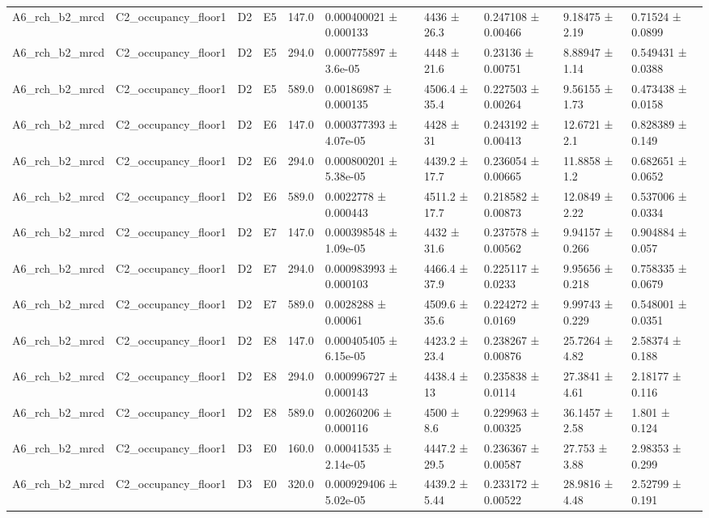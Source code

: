 \begin{table}
\begin{tabular}{llllllllll}
A6\_rch\_b2\_mrcd & C2\_occupancy\_floor1 & D2 & E5 & 147.0 & 0.000400021 ± 0.000133 & 4436 ± 26.3 & 0.247108 ± 0.00466 & 9.18475 ± 2.19 & 0.71524 ± 0.0899 \\
A6\_rch\_b2\_mrcd & C2\_occupancy\_floor1 & D2 & E5 & 294.0 & 0.000775897 ± 3.6e-05 & 4448 ± 21.6 & 0.23136 ± 0.00751 & 8.88947 ± 1.14 & 0.549431 ± 0.0388 \\
A6\_rch\_b2\_mrcd & C2\_occupancy\_floor1 & D2 & E5 & 589.0 & 0.00186987 ± 0.000135 & 4506.4 ± 35.4 & 0.227503 ± 0.00264 & 9.56155 ± 1.73 & 0.473438 ± 0.0158 \\
A6\_rch\_b2\_mrcd & C2\_occupancy\_floor1 & D2 & E6 & 147.0 & 0.000377393 ± 4.07e-05 & 4428 ± 31 & 0.243192 ± 0.00413 & 12.6721 ± 2.1 & 0.828389 ± 0.149 \\
A6\_rch\_b2\_mrcd & C2\_occupancy\_floor1 & D2 & E6 & 294.0 & 0.000800201 ± 5.38e-05 & 4439.2 ± 17.7 & 0.236054 ± 0.00665 & 11.8858 ± 1.2 & 0.682651 ± 0.0652 \\
A6\_rch\_b2\_mrcd & C2\_occupancy\_floor1 & D2 & E6 & 589.0 & 0.0022778 ± 0.000443 & 4511.2 ± 17.7 & 0.218582 ± 0.00873 & 12.0849 ± 2.22 & 0.537006 ± 0.0334 \\
A6\_rch\_b2\_mrcd & C2\_occupancy\_floor1 & D2 & E7 & 147.0 & 0.000398548 ± 1.09e-05 & 4432 ± 31.6 & 0.237578 ± 0.00562 & 9.94157 ± 0.266 & 0.904884 ± 0.057 \\
A6\_rch\_b2\_mrcd & C2\_occupancy\_floor1 & D2 & E7 & 294.0 & 0.000983993 ± 0.000103 & 4466.4 ± 37.9 & 0.225117 ± 0.0233 & 9.95656 ± 0.218 & 0.758335 ± 0.0679 \\
A6\_rch\_b2\_mrcd & C2\_occupancy\_floor1 & D2 & E7 & 589.0 & 0.0028288 ± 0.00061 & 4509.6 ± 35.6 & 0.224272 ± 0.0169 & 9.99743 ± 0.229 & 0.548001 ± 0.0351 \\
A6\_rch\_b2\_mrcd & C2\_occupancy\_floor1 & D2 & E8 & 147.0 & 0.000405405 ± 6.15e-05 & 4423.2 ± 23.4 & 0.238267 ± 0.00876 & 25.7264 ± 4.82 & 2.58374 ± 0.188 \\
A6\_rch\_b2\_mrcd & C2\_occupancy\_floor1 & D2 & E8 & 294.0 & 0.000996727 ± 0.000143 & 4438.4 ± 13 & 0.235838 ± 0.0114 & 27.3841 ± 4.61 & 2.18177 ± 0.116 \\
A6\_rch\_b2\_mrcd & C2\_occupancy\_floor1 & D2 & E8 & 589.0 & 0.00260206 ± 0.000116 & 4500 ± 8.6 & 0.229963 ± 0.00325 & 36.1457 ± 2.58 & 1.801 ± 0.124 \\
A6\_rch\_b2\_mrcd & C2\_occupancy\_floor1 & D3 & E0 & 160.0 & 0.00041535 ± 2.14e-05 & 4447.2 ± 29.5 & 0.236367 ± 0.00587 & 27.753 ± 3.88 & 2.98353 ± 0.299 \\
A6\_rch\_b2\_mrcd & C2\_occupancy\_floor1 & D3 & E0 & 320.0 & 0.000929406 ± 5.02e-05 & 4439.2 ± 5.44 & 0.233172 ± 0.00522 & 28.9816 ± 4.48 & 2.52799 ± 0.191 \\

\end{tabular}
\end{table}
